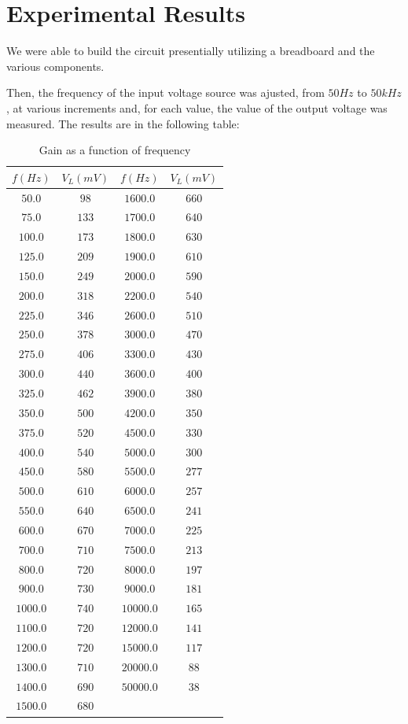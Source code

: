 \section{Experimental Results}
\label{sec:lab}

We were able to build the circuit presentially utilizing a breadboard and the various components.

Then, the frequency of the input voltage source was ajusted, from $50 Hz$ to $50 kHz$, at various increments and, for each value, the value of the output voltage was measured.
The results are in the following table:

\begin{table}
    \caption{Gain as a function of frequency}
    \vspace{-3mm}
    \begin{tabular}{|c|c|c|c|}
    \hline
    $f(Hz)$ &  $V_L(mV)$ & $f(Hz)$ &  $V_L(mV)$\\
    \hline 
    $50.0$  &   $98$  & $1600.0$ &  $660$\\
    $75.0$  &   $133$ & $1700.0$ &  $640$\\
    $100.0$ &  $173$  & $1800.0$ &  $630$\\
    $125.0$ &  $209$  & $1900.0$ &  $610$\\
    $150.0$ &  $249$  & $2000.0$ &  $590$\\
    $200.0$ &  $318$  & $2200.0$ &  $540$\\
    $225.0$ &  $346$  & $2600.0$ &  $510$\\
    $250.0$ &  $378$  & $3000.0$ &  $470$\\
    $275.0$ &  $406$  & $3300.0$ &  $430$\\
    $300.0$ &  $440$  & $3600.0$ &  $400$\\
    $325.0$ &  $462$  & $3900.0$ &  $380$\\
    $350.0$ &  $500$  & $4200.0$ &  $350$\\
    $375.0$ &  $520$  & $4500.0$ &  $330$\\
    $400.0$ &  $540$  & $5000.0$ &  $300$\\
    $450.0$ &  $580$  & $5500.0$ &  $277$\\
    $500.0$ &  $610$  & $6000.0$ &  $257$\\
    $550.0$ &  $640$  & $6500.0$ &  $241$\\
    $600.0$ &  $670$  & $7000.0$ &  $225$\\
    $700.0$ &  $710$  & $7500.0$ &  $213$\\
    $800.0$ &  $720$  & $8000.0$ &  $197$\\
    $900.0$ &  $730$  & $9000.0$ &  $181$\\
    $1000.0$ &  $740$ & $10000.0$&  $165$\\
    $1100.0$ &  $720$ & $12000.0$&  $141$\\
    $1200.0$ &  $720$ & $15000.0$&  $117$\\
    $1300.0$ &  $710$ & $20000.0$ &  $88$\\
    $1400.0$ &  $690$ & $50000.0$ &  $38$\\
    $1500.0$ &  $680$ & &\\


\end{tabular}
\end{table}
